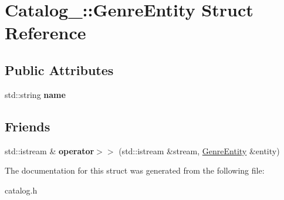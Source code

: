 \hypertarget{struct_catalog___1_1_genre_entity}{}\section{Catalog\+\_\+\+:\+:Genre\+Entity Struct Reference}
\label{struct_catalog___1_1_genre_entity}
\subsection*{Public Attributes}
\begin{DoxyCompactItemize}
\item 
std\+::string {\bfseries name}\hypertarget{struct_catalog___1_1_genre_entity_a695790b7c7c4cd43c1e302c35f6aa898}{}\label{struct_catalog___1_1_genre_entity_a695790b7c7c4cd43c1e302c35f6aa898}

\end{DoxyCompactItemize}
\subsection*{Friends}
\begin{DoxyCompactItemize}
\item 
std\+::istream \& {\bfseries operator$>$$>$} (std\+::istream \&stream, \hyperlink{struct_catalog___1_1_genre_entity}{Genre\+Entity} \&entity)\hypertarget{struct_catalog___1_1_genre_entity_a0373ab791f1dcfd45aba717b29b5ef67}{}\label{struct_catalog___1_1_genre_entity_a0373ab791f1dcfd45aba717b29b5ef67}

\end{DoxyCompactItemize}


The documentation for this struct was generated from the following file\+:\begin{DoxyCompactItemize}
\item 
catalog.\+h\end{DoxyCompactItemize}

